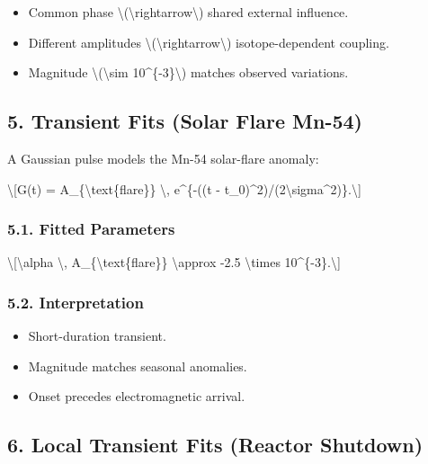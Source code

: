 \documentclass[
  10pt,
]{article}
\providecommand{\tightlist}{%
  \setlength{\itemsep}{0pt}\setlength{\parskip}{0pt}}
\begin{document}
\begin{itemize}
\tightlist
\item
  Common phase \textbackslash(\textbackslash rightarrow\textbackslash)
  shared external influence.
\item
  Different amplitudes
  \textbackslash(\textbackslash rightarrow\textbackslash)
  isotope-dependent coupling.
\item
  Magnitude \textbackslash(\textbackslash sim
  10\^{}\{-3\}\textbackslash) matches observed variations.
\end{itemize}

\hypertarget{transient-fits-solar-flare-mn-54}{%
\subsection{5. Transient Fits (Solar Flare
Mn-54)}\label{transient-fits-solar-flare-mn-54}}

A Gaussian pulse models the Mn-54 solar-flare anomaly:

\textbackslash{[}G(t) = A\_\{\textbackslash text\{flare\}\}
\textbackslash, e\^{}\{-((t -
t\_0)\^{}2)/(2\textbackslash sigma\^{}2)\}.\textbackslash{]}

\hypertarget{fitted-parameters}{%
\subsubsection{5.1. Fitted Parameters}\label{fitted-parameters}}

\textbackslash{[}\textbackslash alpha \textbackslash,
A\_\{\textbackslash text\{flare\}\} \textbackslash approx -2.5
\textbackslash times 10\^{}\{-3\}.\textbackslash{]}

\hypertarget{interpretation-1}{%
\subsubsection{5.2. Interpretation}\label{interpretation-1}}

\begin{itemize}
\tightlist
\item
  Short-duration transient.
\item
  Magnitude matches seasonal anomalies.
\item
  Onset precedes electromagnetic arrival.
\end{itemize}

\hypertarget{local-transient-fits-reactor-shutdown}{%
\subsection{6. Local Transient Fits (Reactor
Shutdown)}\label{local-transient-fits-reactor-shutdown}}
\end{document}
